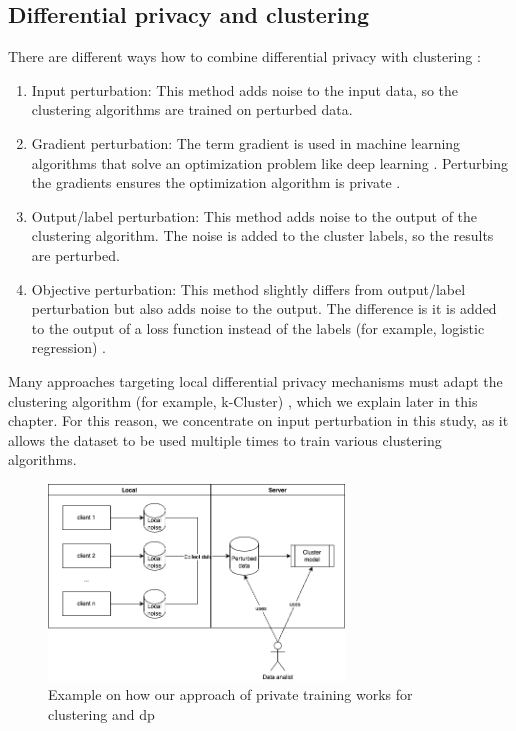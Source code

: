 \subsection{Differential privacy and clustering} \label{theory:literature-review:dp-clustering}
There are different ways how to combine differential privacy with clustering \citep{baraheem_survey_2022}:
\begin{enumerate}
    \item Input perturbation: This method adds noise to the input data, so the clustering algorithms are trained on perturbed data.
    \item Gradient perturbation: The term gradient is used in machine learning algorithms that solve an optimization problem like deep learning \citep{hassan_differential_2019}.
          Perturbing the gradients ensures the optimization algorithm is private \citep{ji_differential_2014}.
    \item Output/label perturbation: This method adds noise to the output of the clustering algorithm.
          The noise is added to the cluster labels, so the results are perturbed.
    \item Objective perturbation: This method slightly differs from output/label perturbation but also adds noise to the output.
          The difference is it is added to the output of a loss function instead of the labels (for example, logistic regression) \citep{baraheem_survey_2022}.
\end{enumerate}
Many approaches targeting local differential privacy mechanisms must adapt the clustering algorithm (for example, k-Cluster) \citep{sun_distributed_2019}, which we explain later in this chapter.
For this reason, we concentrate on input perturbation in this study, as it allows the dataset to be used multiple times to train various clustering algorithms.
\begin{figure}[H]
    \includegraphics[width=0.7\textwidth]{./TheorethicalFramework/ND-Laplace/Images/overview-clustering&dp.png}
    \caption{Example on how our approach of private training works for clustering and \gls{dp}}
    \label{fig:overview-clustering-and-dp}
\end{figure}
